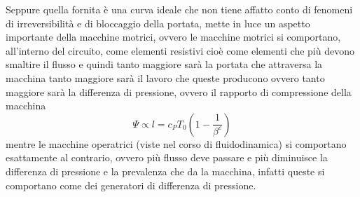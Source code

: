 \documentclass[a4paper, 15pt]{article}
\begin{document}
\begin{adjustwidth}{2in}{}
	Seppure quella fornita è una curva ideale che non tiene affatto conto di fenomeni di irreversibilità e di bloccaggio della portata, mette in luce  un aspetto importante della macchine motrici, ovvero le macchine motrici si comportano, all'interno del circuito, come elementi resistivi cioè come elementi che più devono smaltire il flusso e quindi tanto maggiore sarà la portata che attraversa la macchina tanto maggiore sarà il  lavoro che queste producono ovvero tanto maggiore sarà la differenza di pressione, ovvero il rapporto di compressione della macchina 
	\[\Psi \propto l = c_PT_0\left(1-\dfrac{1}{\beta^\varepsilon}\right)\]
	mentre le macchine operatrici (viste nel corso di fluidodinamica) si comportano esattamente al contrario, ovvero più flusso deve  passare e più diminuisce la differenza di pressione e la prevalenza che da la macchina, infatti queste si comportano come dei generatori di differenza di pressione.
\end{adjustwidth}	 




 
\end{document}
